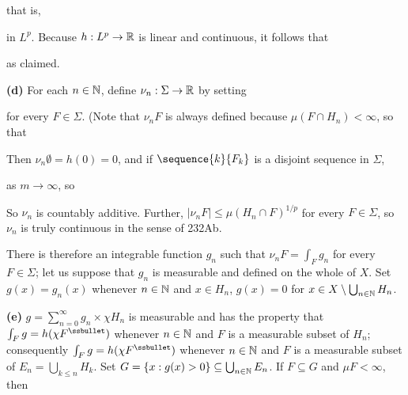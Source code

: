 {\noindent that is,


\noindent in $L^p$.   Because $h:L^p\to\Bbb R$ is linear and
continuous, it follows that


\noindent as claimed.\ \Qed

\medskip

{\bf (d)} For each $n\in\Bbb N$, define $\nu_n:\Sigma\to\Bbb R$ by
setting


\noindent for every $F\in\Sigma$.   (Note that $\nu_nF$ is always
defined because $\mu(F\cap H_n)<\infty$, so that


\noindent   Then $\nu_n\emptyset=h(0)=0$,
and if $\sequence{k}{F_k}$ is a disjoint sequence in $\Sigma$,


\noindent as $m\to\infty$, so


\noindent   So $\nu_n$ is countably additive.
Further, $|\nu_nF|\le\mu(H_n\cap F)^{1/p}$ for every $F\in\Sigma$,
so $\nu_n$ is truly continuous in the sense of 232Ab.

There is therefore an integrable function $g_n$ such that
$\nu_nF=\int_Fg_n$ for every $F\in\Sigma$;  let us suppose that
$g_n$ is measurable and defined on the whole of $X$.   Set
$g(x)=g_n(x)$ whenever $n\in\Bbb N$ and $x\in H_n$,
$g(x)=0$ for $x\in X\setminus\bigcup_{n\in\Bbb N}H_n$.

\medskip

{\bf (e)} $g=\sum_{n=0}^{\infty}g_n\times\chi H_n$ is measurable
and has the property that
$\int_Fg=h(\chi F^{\ssbullet})$
whenever $n\in\Bbb N$ and $F$ is a measurable subset of $H_n$;
consequently $\int_Fg=h(\chi F^{\ssbullet})$ whenever $n\in\Bbb N$
and $F$ is a measurable subset of $E_n=\bigcup_{k\le n}H_k$.   Set
$G=\{x:g(x)>0\}\subseteq\bigcup_{n\in\Bbb N}E_n$.   If $F\subseteq G$
and $\mu F<\infty$, then

}
